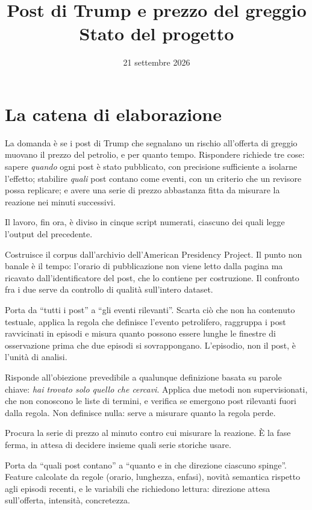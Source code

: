 \documentclass[11pt,a4paper]{article}
\title{Post di Trump e prezzo del greggio\\[2pt]
\large Stato del progetto}
\author{}
\date{21 settembre 2026}
\begin{document}
\maketitle
\vspace{-2em}

\section{La catena di elaborazione}

La domanda è se i post di Trump che segnalano un rischio all'offerta di
greggio muovano il prezzo del petrolio, e per quanto tempo. Rispondere
richiede tre cose: sapere \emph{quando} ogni post è stato pubblicato, con
precisione sufficiente a isolarne l'effetto; stabilire \emph{quali} post
contano come eventi, con un criterio che un revisore possa replicare; e avere
una serie di prezzo abbastanza fitta da misurare la reazione nei minuti
successivi.

Il lavoro, fin ora, è diviso in cinque script numerati, ciascuno dei quali legge
l'output del precedente.

\begin{description}[leftmargin=1.6cm,style=nextline,itemsep=5pt]

\item[\texttt{00}\ \ scraping] Costruisce il corpus dall'archivio
dell'American Presidency Project. Il punto non banale è il tempo: l'orario di
pubblicazione non viene letto dalla pagina ma ricavato dall'identificatore del
post, che lo contiene per costruzione. Il confronto fra i due serve da
controllo di qualità sull'intero dataset.

\item[\texttt{01}\ \ selezione] Porta da ``tutti i post'' a ``gli eventi
rilevanti''. Scarta ciò che non ha contenuto testuale, applica la regola che
definisce l'evento petrolifero, raggruppa i post ravvicinati in episodi e
misura quanto possono essere lunghe le finestre di osservazione prima che due
episodi si sovrappongano. L'episodio, non il post, è l'unità di analisi.

\item[\texttt{02}\ \ audit] Risponde all'obiezione prevedibile a qualunque
definizione basata su parole chiave: \emph{hai trovato solo quello che
cercavi}. Applica due metodi non supervisionati, che non conoscono le liste di
termini, e verifica se emergono post rilevanti fuori dalla regola. Non
definisce nulla: serve a misurare quanto la regola perde.

\item[\texttt{03}\ \ prezzi] Procura la serie di prezzo al minuto contro cui
misurare la reazione. È la fase ferma, in attesa di decidere insieme quali
serie storiche usare.

\item[\texttt{04}\ \ feature] Porta da ``quali post contano'' a ``quanto e in
che direzione ciascuno spinge''. Feature calcolate da regole (orario,
lunghezza, enfasi), novità semantica rispetto agli episodi recenti, e le
variabili che richiedono lettura: direzione attesa sull'offerta, intensità,
concretezza.

\end{description}
\end{document}
